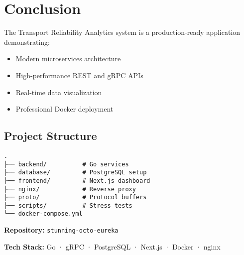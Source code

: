 \documentclass[11pt,a4paper]{article}
\begin{document}
\section{Conclusion}

The Transport Reliability Analytics system is a production-ready application demonstrating:

\begin{itemize}[leftmargin=*]
    \item Modern microservices architecture
    \item High-performance REST and gRPC APIs
    \item Real-time data visualization
    \item Professional Docker deployment
\end{itemize}

\subsection{Project Structure}

\begin{lstlisting}
.
├── backend/          # Go services
├── database/         # PostgreSQL setup
├── frontend/         # Next.js dashboard
├── nginx/            # Reverse proxy
├── proto/            # Protocol buffers
├── scripts/          # Stress tests
└── docker-compose.yml
\end{lstlisting}

\vspace{1cm}

\noindent
\textbf{Repository:} \texttt{stunning-octo-eureka}

\noindent
\textbf{Tech Stack:} Go · gRPC · PostgreSQL · Next.js · Docker · nginx
\end{document}
